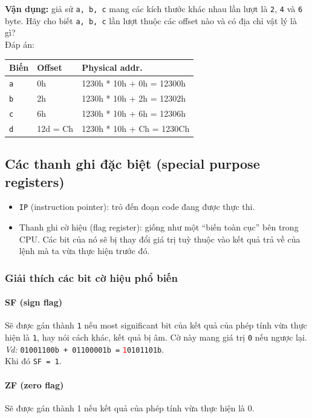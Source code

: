 \documentclass[12pt]{report}
\newcommand{\code}[1]{\texttt{#1}}
\begin{document}
\textbf{Vận dụng:} giả sử \code{a, b, c} mang các kích thước khác nhau lần lượt là \code{2}, \code 4 và \code 6 byte. Hãy cho biết \code{a, b, c} lần lượt thuộc các offset nào và có địa chỉ vật lý là gì? \\
Đáp án:
\begin{table}[H]
    \centering
    \begin{tabular}{|l|l|l|}
    \hline
    Biến        & Offset    & Physical addr.          \\
    \hline
    \code{a}    & 0h         & 1230h * 10h + 0h = 12300h \\
    \code{b}    & 2h         & 1230h * 10h + 2h = 12302h \\
    \code{c}    & 6h         & 1230h * 10h + 6h = 12306h \\
    \code{d}    & 12d = Ch   & 1230h * 10h + Ch = 1230Ch \\
    \hline
    \end{tabular}
\end{table}

\subsection{Các thanh ghi đặc biệt (special purpose registers)}
\begin{itemize}
    \item \code{IP} (instruction pointer): trỏ đến đoạn code đang được thực thi.
    \item Thanh ghi cờ hiệu (flag register): giống như một ``biến toàn cục'' bên trong CPU. Các bit của nó sẽ bị thay đổi giá trị tuỳ thuộc vào kết quả trả về của lệnh mà ta vừa thực hiện trước đó.
\end{itemize}

\subsubsection{Giải thích các bit cờ hiệu phổ biến}
\paragraph{SF (sign flag)}
Sẽ được gán thành \code 1 nếu most significant bit của kết quả của phép tính vừa thực hiện là \code 1, hay nói cách khác, kết quả bị âm. Cờ này mang giá trị \code 0 nếu ngược lại.\break
\textit{Vd:} \code{01001100b + 01100001b =} \textcolor{red}{\code 1}\code{0101101b}.\\ 
Khi đó \code{SF = 1}.
\bigskip

\paragraph{ZF (zero flag)}
Sẽ được gán thành 1 nếu kết quả của phép tính vừa thực hiện là 0.
\bigskip 
\end{document}
